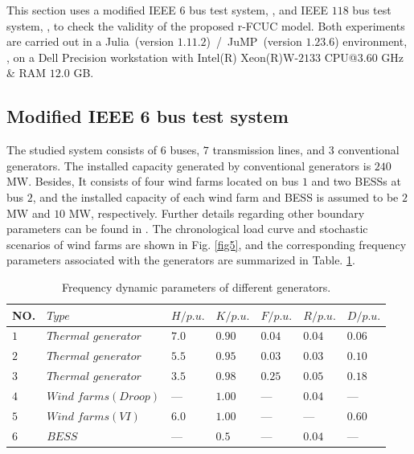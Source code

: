 \documentclass[lettersize,journal]{IEEEtran}
\begin{document}
\vspace{-0.025in}

This section uses a modified IEEE $6$ bus test system, \cite{mahmoudnia2024enhancing,zhang2020modeling}, and IEEE $118$ bus test system, \cite{demetriou2015dynamic,9765359}, to check the validity of the proposed r-FCUC model. Both experiments are carried out in a Julia~(version $1.11.2$)~/~JuMP~(version $1.23.6$) environment, \cite{Lubin2023}, on a Dell Precision workstation with Intel(R) Xeon(R)W-$2133$ CPU@$3.60$ GHz \& RAM $12.0$ GB.

\vspace{-1.25em} \subsection{Modified IEEE 6 bus test system} \vspace{-0.25em}

The studied system consists of $6$ buses, $7$ transmission lines, and $3$ conventional generators. The installed capacity generated by conventional generators is $240$MW. Besides, It consists of four wind farms located on bus $1$ and two BESSs at bus $2$, and the installed capacity of each wind farm and BESS is assumed to be $2$ MW and $10$ MW, respectively. Further details regarding other boundary parameters can be found in \cite{10098683}. The chronological load curve and stochastic scenarios of wind farms are shown in Fig. \ref{fig5}, and the corresponding frequency parameters associated with the generators are summarized in Table. \ref{table 1}.

\begin{table}\vspace{-0.125in}
	\caption{Frequency dynamic parameters of different generators.} \label{table 1} 
	\begin{tabular}{p{0.25cm}|p{2.75cm}|p{0.6cm}p{0.6cm}p{0.6cm}p{0.6cm}p{0.6cm}} \hline 
	NO. & $Type$ & $H/p.u.$   & $K/p.u.$    & $F/p.u.$    & $R/p.u.$    & $D/p.u.$\\
\hline 
$1$       & $Thermal\,\, generator$   & $7.0$   & $0.90$  & $0.04$ & $0.04$ & $0.06$     \\
$2$       & $Thermal\,\, generator$  & $5.5$ & $0.95$ & $0.03$ & $0.03$ & $0.10$      \\
$3$       & $Thermal\,\, generator$  & $3.5$ & $0.98$ & $0.25$ & $0.05$ & $0.18$    \\
$4$       & $Wind\,\, farms (Droop)$ & —   & $1.00$    & —    & $0.04$ & —     \\
$5$       & $Wind\,\, farms (VI)$ & $6.0$   & $1.00$    & —    & —    & $0.60$   \\
$6$       & $BESS$       & —   & $0.5$  & —    & $0.04$ & —     \\
\hline \end{tabular} \end{table}
\end{document}
